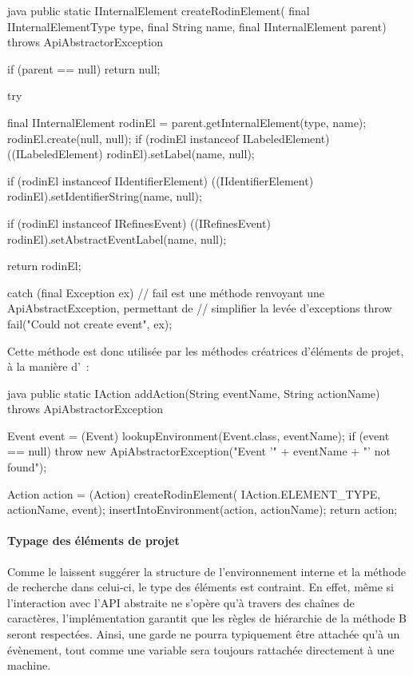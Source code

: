 \begin{imtaCode}{java}
public static IInternalElement createRodinElement(
            final IInternalElementType type,
            final String name,
            final IInternalElement parent)
    throws ApiAbstractorException
    {
        if (parent == null)
            return null;

        try {
            final IInternalElement rodinEl = parent.getInternalElement(type, name);
            rodinEl.create(null, null);
            if (rodinEl instanceof ILabeledElement)
                ((ILabeledElement) rodinEl).setLabel(name, null);

            if (rodinEl instanceof IIdentifierElement)
                ((IIdentifierElement) rodinEl).setIdentifierString(name, null);

            if (rodinEl instanceof IRefinesEvent)
                ((IRefinesEvent) rodinEl).setAbstractEventLabel(name, null);

            return rodinEl;

    } catch (final Exception ex) {
        // fail est une méthode renvoyant une ApiAbstractException, permettant de
        // simplifier la levée d'exceptions
        throw fail("Could not create event", ex);
    }
}
\end{imtaCode}

Cette méthode est donc utilisée par les méthodes créatrices d'éléments de projet, à la manière d'~:

\begin{imtaCode}{java}
public static IAction addAction(String eventName, String actionName) 
    throws ApiAbstractorException 
    {
    Event event = (Event) lookupEnvironment(Event.class, eventName);
    if (event == null)
        throw new ApiAbstractorException("Event '" + eventName + "' not found");

    Action action = (Action) createRodinElement(
                                IAction.ELEMENT_TYPE, actionName, event);
    insertIntoEnvironment(action, actionName);
    return action;
}
\end{imtaCode}


\paragraph{Typage des éléments de projet}

Comme le laissent suggérer la structure de l'environnement interne et la méthode de recherche dans celui-ci, le type des éléments est contraint.
En effet, même si l'interaction avec l'API abstraite ne s'opère qu'à travers des chaînes de caractères, l'implémentation garantit que les règles de hiérarchie de la méthode B seront respectées.
Ainsi, une garde ne pourra typiquement être attachée qu'à un évènement, tout comme une variable sera toujours rattachée directement à une machine.


